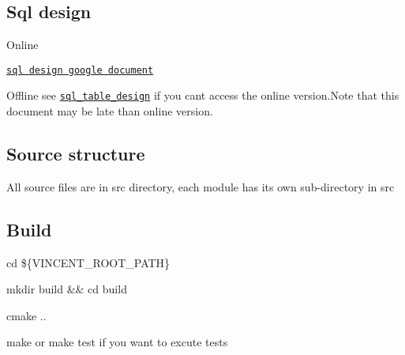 \href{https://app.codacy.com/app/maidamai0/vincent?utm_source=github.com&utm_medium=referral&utm_content=advanced-data-processing-company/vincent&utm_campaign=Badge_Grade_Settings}{\tt } \href{https://travis-ci.org/advanced-data-processing-company/vincent}{\tt } \href{https://ci.appveyor.com/project/maidamai0/vincent}{\tt } \href{https://lgtm.com/projects/g/advanced-data-processing-company/vincent/alerts/}{\tt } \href{https://lgtm.com/projects/g/advanced-data-processing-company/vincent/context:javascript}{\tt }

\subsection*{Sql design}


\begin{DoxyItemize}
\item Online

\href{https://docs.google.com/document/d/1QlFliN9hr0bRWUpu1whWGgTl2qbUMroOrxDV7gtdL20/edit}{\tt sql design google document}
\item Offline see \href{https://htmlpreview.github.io/?https://github.com/advanced-data-processing-company/vincent/blob/master/sql_table_design.html}{\tt sql\+\_\+table\+\_\+design} if you can\textquotesingle{}t access the online version.\+Note that this document may be late than online version.
\end{DoxyItemize}

\subsection*{Source structure}

All source files are in {\ttfamily src} directory, each module has its own sub-\/directory in {\ttfamily src}

\subsection*{Build}


\begin{DoxyEnumerate}
\item {\ttfamily cd \$\{V\+I\+N\+C\+E\+N\+T\+\_\+\+R\+O\+O\+T\+\_\+\+P\+A\+TH\}}
\item {\ttfamily mkdir build \&\& cd build}
\item {\ttfamily cmake ..}
\item {\ttfamily make} or {\ttfamily make test} if you want to excute tests
\end{DoxyEnumerate}

